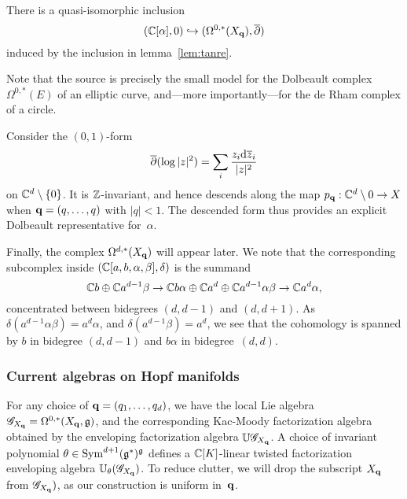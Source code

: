 \begin{lem}
There is a quasi-isomorphic inclusion 
\[
(\mathbb C[\alpha], 0) \hookrightarrow (\Omega^{0,*}(X_{\bf q}), \overline{\partial})
\]
induced by the inclusion in lemma~\ref{lem:tanre}.
\end{lem}

Note that the source is precisely the small model for the Dolbeault complex $\Omega^{0, *}(E)$ of an elliptic curve,
and---more importantly---for the de Rham complex of a circle.

\begin{eg}
Consider 
the $(0,1)$-form 
\[
\overline{\partial} (\log |z|^2) = \sum_i \frac{z_i{\rm d} \overline{z}_i}{|z|^2} 
\]
on $\mathbb C^d \setminus \{0\}$.
It is $\mathbb Z$-invariant, and hence descends along the map $p_{\bf q} : \mathbb C^d \setminus 0 \to X$
when ${\bf q} = (q,\ldots,q)$ with $|q| < 1$.
The descended form thus provides an explicit Dolbeault representative for~$\alpha$.
\end{eg}

Finally, the complex  $\Omega^{d, *}(X_{\bf q})$ will appear later. 
We note that the corresponding subcomplex inside $(\mathbb C[a, b, \alpha, \beta], \delta)$ is the summand
\[
\mathbb C b \oplus \mathbb C a^{d-1} \beta \to \mathbb C b \alpha \oplus \mathbb C a^{d} \oplus \mathbb C a^{d-1} \alpha \beta \to \mathbb C a^{d} \alpha,
\]
concentrated between bidegrees $(d,d-1)$ and $(d,d+1)$.
As $\delta(a^{d-1} \alpha \beta) = a^d \alpha$, and $\delta(a^{d-1} \beta) = a^d$, 
we see that the cohomology is spanned by $b$ in bidegree $(d,d-1)$ and $b \alpha$ in bidegree~$(d,d)$.


\subsubsection{Current algebras on Hopf manifolds}

For any choice of ${\bf q} = (q_1,\ldots,q_d)$, we have the local Lie algebra $\mathscr G_{X_{\bf q}} = \Omega^{0,*}(X_{\bf q}, \mathfrak g)$, and the corresponding Kac-Moody factorization algebra obtained by the enveloping factorization algebra $\mathbb U\mathscr G_{X_{\bf q}}$.
A choice of invariant polynomial $\theta \in {\rm Sym}^{d+1}(\mathfrak g^*)^\mathfrak g$ defines a $\mathbb C[K]$-linear twisted factorization enveloping algebra $\mathbb U_{\theta}(\mathscr G_{X_{\bf q}})$.  
To reduce clutter, we will drop the subscript $X_{\bf q}$ from $\mathscr G_{X_{\bf q}})$, as our construction is uniform in~${\bf q}$.

